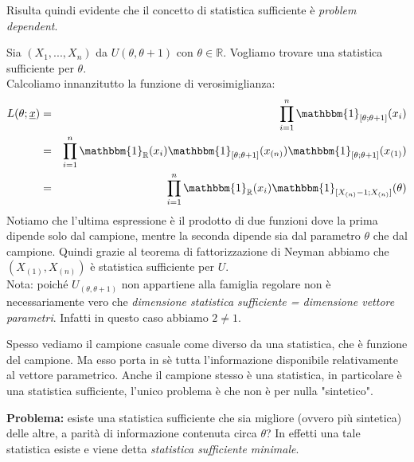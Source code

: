 Risulta quindi evidente che il concetto di statistica sufficiente è \emph{problem dependent}.
\\
\begin{esempio} Sia $(X_1,...,X_n)$ da $U(\theta, \theta +1)$ con $\theta \in \mathbb{R}$. Vogliamo trovare una statistica sufficiente per $\theta$.\\
Calcoliamo innanzitutto la funzione di verosimiglianza:
\begin{eqnarray}
L(\theta;\underline{x}) &=& \displaystyle\prod_{i=1}^n \mathbbm{1}_{[\theta; \theta +1]}(x_i)\\
&=& \displaystyle\prod_{i=1}^n \mathbbm{1}_{\mathbb{R}}(x_i) \mathbbm{1}_{[\theta; \theta +1]}(x_{(n)}) \mathbbm{1}_{[\theta; \theta +1]}(x_{(1)})\\
&=& \displaystyle\prod_{i=1}^n \mathbbm{1}_{\mathbb{R}}(x_i) \mathbbm{1}_{[X_{(n)}-1; X_{(n)}]}(\theta)
\end{eqnarray}
Notiamo che l'ultima espressione è il prodotto di due funzioni dove la prima dipende solo dal campione, mentre la seconda dipende sia dal parametro $\theta$ che dal campione. Quindi grazie al teorema di fattorizzazione di Neyman abbiamo che $(X_{(1)},X_{(n)})$ è statistica sufficiente per $U$.\\
Nota: poiché $U_{(\theta, \theta +1)}$ non appartiene alla famiglia regolare non è necessariamente vero che \emph{dimensione statistica sufficiente = dimensione vettore parametri}. Infatti in questo caso abbiamo $2 \neq 1$.
\end{esempio}

\begin{oss} Spesso vediamo il campione casuale come diverso da una statistica, che è funzione del campione. Ma esso porta in sè tutta l'informazione disponibile relativamente al vettore parametrico. Anche il campione stesso è una statistica, in particolare è una statistica sufficiente, l'unico problema è che non è per nulla "sintetico".
\end{oss}

\textbf{Problema:} esiste una statistica sufficiente che sia migliore (ovvero più sintetica) delle altre, a parità di informazione contenuta circa $\theta$? In effetti una tale statistica esiste e viene detta \textit{statistica sufficiente minimale}.